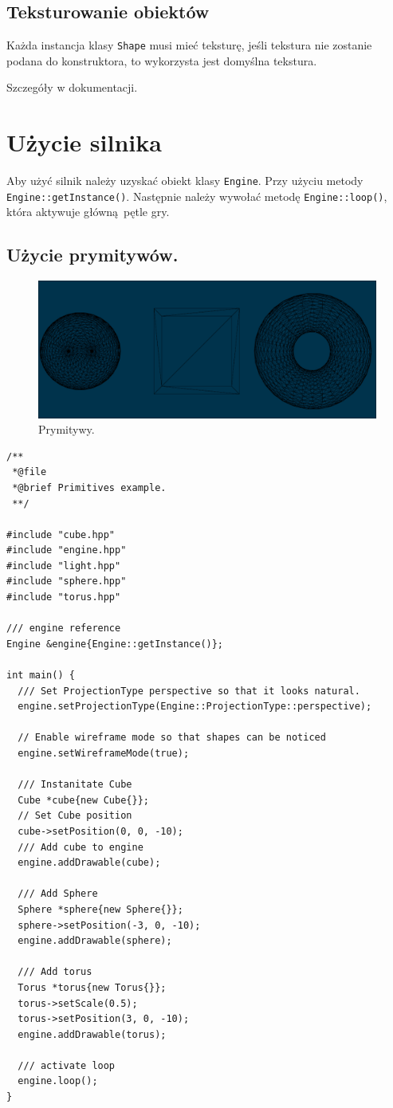 \documentclass[11pt]{article}
\begin{document}
\subsection{Teksturowanie obiektów}
\label{sec:org7522fd4}

Każda instancja klasy \texttt{Shape} musi mieć teksturę, jeśli tekstura nie zostanie podana do konstruktora, to wykorzysta jest domyślna tekstura.

Szczegóły w dokumentacji.
\section{Użycie silnika}
\label{sec:org357a322}
Aby użyć silnik należy uzyskać obiekt klasy \texttt{Engine}. Przy użyciu metody \texttt{Engine::getInstance()}.
Następnie należy wywołać metodę \texttt{Engine::loop()}, która aktywuje główną pętle gry.
\subsection{Użycie prymitywów.}
\label{sec:org9a875c6}
\begin{figure}[htbp]
\centering
\includegraphics[width=.9\linewidth]{img/test14.png}
\caption{Prymitywy.}
\end{figure}

\begin{verbatim}
/**
 *@file
 *@brief Primitives example.
 **/

#include "cube.hpp"
#include "engine.hpp"
#include "light.hpp"
#include "sphere.hpp"
#include "torus.hpp"

/// engine reference
Engine &engine{Engine::getInstance()};

int main() {
  /// Set ProjectionType perspective so that it looks natural.
  engine.setProjectionType(Engine::ProjectionType::perspective);

  // Enable wireframe mode so that shapes can be noticed
  engine.setWireframeMode(true);

  /// Instanitate Cube
  Cube *cube{new Cube{}};
  // Set Cube position
  cube->setPosition(0, 0, -10);
  /// Add cube to engine
  engine.addDrawable(cube);

  /// Add Sphere
  Sphere *sphere{new Sphere{}};
  sphere->setPosition(-3, 0, -10);
  engine.addDrawable(sphere);

  /// Add torus
  Torus *torus{new Torus{}};
  torus->setScale(0.5);
  torus->setPosition(3, 0, -10);
  engine.addDrawable(torus);

  /// activate loop
  engine.loop();
}
\end{verbatim}
\end{document}
